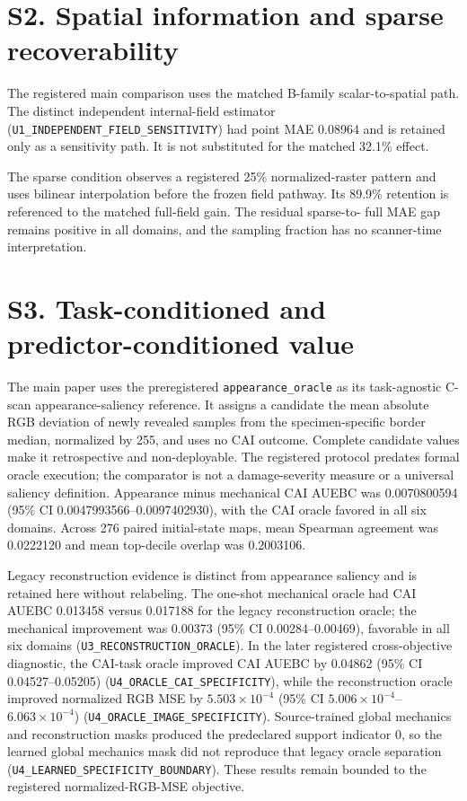 \documentclass[11pt]{article}
\begin{document}
\section{S2. Spatial information and sparse recoverability}

The registered main comparison uses the matched B-family scalar-to-spatial
path. The distinct independent internal-field estimator
(\texttt{U1\_INDEPENDENT\_FIELD\_SENSITIVITY}) had point MAE 0.08964 and is
retained only as a sensitivity path. It is not substituted for the matched
32.1\% effect.

The sparse condition observes a registered 25\% normalized-raster pattern and
uses bilinear interpolation before the frozen field pathway. Its 89.9\%
retention is referenced to the matched full-field gain. The residual sparse-to-
full MAE gap remains positive in all domains, and the sampling fraction has no
scanner-time interpretation.

\section{S3. Task-conditioned and predictor-conditioned value}

The main paper uses the preregistered \texttt{appearance\_oracle} as its
task-agnostic C-scan appearance-saliency reference. It assigns a candidate the mean
absolute RGB deviation of newly revealed samples from the specimen-specific
border median, normalized by 255, and uses no CAI outcome. Complete candidate
values make it retrospective and non-deployable. The registered protocol
predates formal oracle execution; the comparator is not a damage-severity
measure or a universal saliency definition. Appearance minus mechanical CAI
AUEBC was 0.0070800594 (95\% CI 0.0047993566--0.0097402930), with the CAI oracle
favored in all six domains. Across 276 paired initial-state maps, mean Spearman
agreement was 0.0222120 and mean top-decile overlap was 0.2003106.

Legacy reconstruction evidence is distinct from appearance saliency and is
retained here without relabeling. The one-shot mechanical oracle had CAI AUEBC
0.013458 versus 0.017188 for the legacy reconstruction oracle; the mechanical
improvement was 0.00373 (95\% CI 0.00284--0.00469), favorable in all six
domains (\texttt{U3\_RECONSTRUCTION\_ORACLE}). In the later registered
cross-objective diagnostic, the CAI-task oracle improved CAI AUEBC by 0.04862
(95\% CI 0.04527--0.05205)
(\texttt{U4\_ORACLE\_CAI\_SPECIFICITY}), while the reconstruction oracle
improved normalized RGB MSE by $5.503\times10^{-4}$ (95\% CI
$5.006\times10^{-4}$--$6.063\times10^{-4}$)
(\texttt{U4\_ORACLE\_IMAGE\_SPECIFICITY}). Source-trained global mechanics and
reconstruction masks produced the predeclared support indicator 0, so the
learned global mechanics mask did not reproduce that legacy oracle separation
(\texttt{U4\_LEARNED\_SPECIFICITY\_BOUNDARY}). These results remain bounded to
the registered normalized-RGB-MSE objective.
\end{document}

